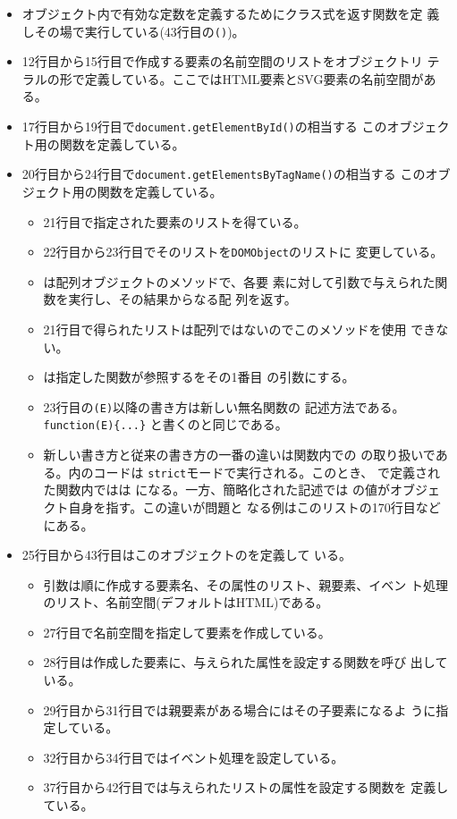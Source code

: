 \begin{itemize}
 \item オブジェクト内で有効な定数を定義するためにクラス式を返す関数を定
       義しその場で実行している(43行目の\texttt{()})。
 \item 12行目から15行目で作成する要素の名前空間のリストをオブジェクトリ
       テラルの形で定義している。ここではHTML要素とSVG要素の名前空間があ
       る。
 \item 17行目から19行目で\texttt{document.getElementById()}の相当する
       このオブジェクト用の関数を定義している。
 \item 20行目から24行目で\texttt{document.getElementsByTagName()}の相当する
       このオブジェクト用の関数を定義している。
       \begin{itemize}
        \item 21行目で指定された要素のリストを得ている。
        \item 22行目から23行目でそのリストを\texttt{DOMObject}のリストに
              変更している。
        \item {}は配列オブジェクトのメソッドで、各要
              素に対して引数で与えられた関数を実行し、その結果からなる配
              列を返す。
        \item 21行目で得られたリストは配列ではないのでこのメソッドを使用
              できない。
        \item {}は指定した関数が参照するをその1番目
              の引数にする。
        \item 23行目の\texttt{(E)}以降の書き方は新しい無名関数の
              記述方法である。\Verb+function(E){...}+
              と書くのと同じである。
        \item 新しい書き方と従来の書き方の一番の違いは関数内での
              の取り扱いである。内のコードは
              \texttt{strict}モードで実行される。このとき、
              で定義された関数内ではは
              になる。一方、簡略化された記述では
              の値がオブジェクト自身を指す。この違いが問題と
              なる例はこのリストの170行目などにある。
       \end{itemize}
 \item 25行目から43行目はこのオブジェクトのを定義して
       いる。
       \begin{itemize}
        \item 引数は順に作成する要素名、その属性のリスト、親要素、イベン
              ト処理のリスト、名前空間(デフォルトはHTML)である。
        \item 27行目で名前空間を指定して要素を作成している。
        \item 28行目は作成した要素に、与えられた属性を設定する関数を呼び
              出している。
        \item 29行目から31行目では親要素がある場合にはその子要素になるよ
              うに指定している。
        \item 32行目から34行目ではイベント処理を設定している。
        \item 37行目から42行目では与えられたリストの属性を設定する関数を
              定義している。
       \end{itemize}
\end{itemize}

